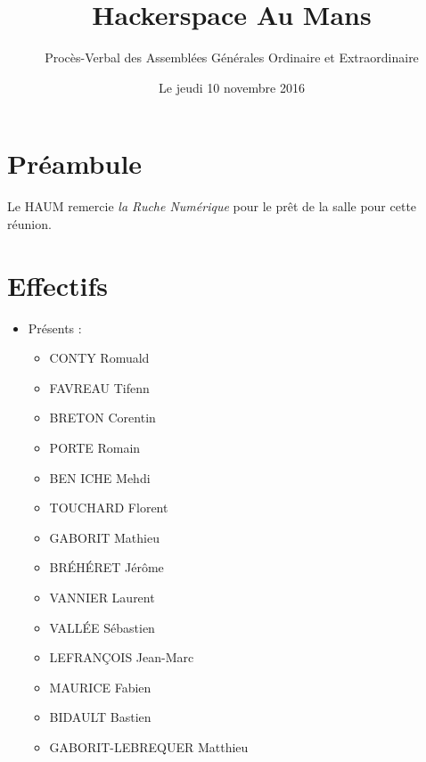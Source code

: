 \documentclass[a4paper, 11pt]{article}
\title{Hackerspace Au Mans}
\author{Procès-Verbal des Assemblées Générales Ordinaire et Extraordinaire}
\date{Le jeudi 10 novembre 2016}
\begin{document}
\maketitle

\section*{Préambule}

Le HAUM remercie \emph{la Ruche Numérique} pour le prêt de la salle pour cette réunion.

\section{Effectifs}

\begin{itemize}
	\item Présents :
		\begin{itemize}
      \item CONTY Romuald
      \item FAVREAU Tifenn
      \item BRETON Corentin
      \item PORTE Romain
      \item BEN ICHE Mehdi
      \item TOUCHARD Florent
      \item GABORIT Mathieu
      \item BRÉHÉRET Jérôme
      \item VANNIER Laurent
      \item VALLÉE Sébastien
      \item LEFRANÇOIS Jean-Marc
      \item MAURICE Fabien
      \item BIDAULT Bastien
      \item GABORIT-LEBREQUER Matthieu


\end{itemize}
\end{itemize}
\end{document}
